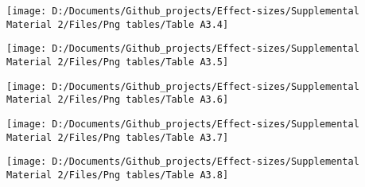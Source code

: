 \documentclass[
  man]{apa6}
\begin{document}
\begin{sidewaysfigure}

{\centering \texttt{[image: D:/Documents/Github\_projects/Effect-sizes/Supplemental Material 2/Files/Png tables/Table A3.4]} 

}

\end{sidewaysfigure}

\begin{sidewaysfigure}

{\centering \texttt{[image: D:/Documents/Github\_projects/Effect-sizes/Supplemental Material 2/Files/Png tables/Table A3.5]} 

}

\end{sidewaysfigure}

\begin{sidewaysfigure}

{\centering \texttt{[image: D:/Documents/Github\_projects/Effect-sizes/Supplemental Material 2/Files/Png tables/Table A3.6]} 

}

\end{sidewaysfigure}

\begin{sidewaysfigure}

{\centering \texttt{[image: D:/Documents/Github\_projects/Effect-sizes/Supplemental Material 2/Files/Png tables/Table A3.7]} 

}

\end{sidewaysfigure}

\begin{sidewaysfigure}

{\centering \texttt{[image: D:/Documents/Github\_projects/Effect-sizes/Supplemental Material 2/Files/Png tables/Table A3.8]} 

}

\end{sidewaysfigure}
\end{document}
